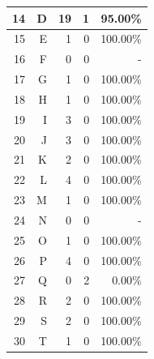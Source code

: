 \begin{longtable}[c]{|r|r|r|r|r|}
	14           & D                 & 19                       & 1                       &95.00\%            \\ \hline
	15           & E                 & 1                       & 0                       &100.00\%            \\ \hline
	16           & F                 & 0                       & 0                       & -            \\ \hline
	17           & G                 & 1                       & 0                       &100.00\%            \\ \hline
	18           & H                 & 1                       & 0                       &100.00\%            \\ \hline
	19           & I                 & 3                       & 0                       &100.00\%            \\ \hline
	20           & J                 & 3                       & 0                       &100.00\%            \\ \hline
	21           & K                 & 2                       & 0                       &100.00\%            \\ \hline
	22           & L                 & 4                       & 0                       &100.00\%            \\ \hline
	23           & M                 & 1                       & 0                       &100.00\%            \\ \hline
	24           & N                 & 0                       & 0                       & -            \\ \hline
	25           & O                 & 1                       & 0                       &100.00\%            \\ \hline
	26           & P                 & 4                       & 0                       &100.00\%            \\ \hline
	27           & Q                 & 0                       & 2                       &0.00\%            \\ \hline
	28           & R                 & 2                       & 0                       &100.00\%            \\ \hline
	29           & S                 & 2                       & 0                       &100.00\%            \\ \hline
	30           & T                 & 1                       & 0                       &100.00\%            \\ \hline

\end{longtable}
